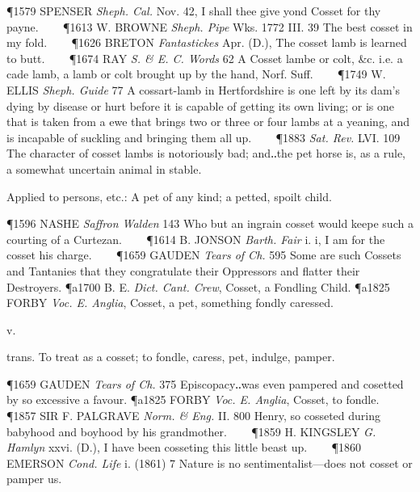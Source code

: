 \begin{description}[wide, labelwidth=!, labelindent=0pt]
\begin{myenumerate}
\P 1579 SPENSER  \textit{Sheph. Cal.} Nov. 42, I shall thee give yond Cosset for thy payne.    
\P 1613 W. BROWNE  \textit{Sheph. Pipe} Wks. 1772 III.  39 The best cosset in my fold.    
\P 1626 BRETON  \textit{Fantastickes} Apr. (D.), The cosset lamb is learned to butt.    
\P 1674 RAY  \textit{S. \& E. C. Words} 62 A Cosset lambe or colt, \&c. i.e. a cade lamb, a lamb or colt brought up by the hand, Norf. Suff.    
\P 1749 W. ELLIS  \textit{Sheph. Guide} 77 A cossart-lamb in Hertfordshire is one left by its dam's dying by disease or hurt before it is capable of getting its own living; or is one that is taken from a ewe that brings two or three or four lambs at a yeaning, and is incapable of suckling and bringing them all up.    
\P 1883  \textit{Sat. Rev.} LVI. 109 The character of cosset lambs is notoriously bad; and‥the pet horse is, as a rule, a somewhat uncertain animal in stable.

 Applied to persons, etc.: A pet of any kind; a petted, spoilt child.

\P 1596 NASHE  \textit{Saffron Walden} 143 Who but an ingrain cosset would keepe such a courting of a Curtezan.    
\P 1614 B. JONSON  \textit{Barth. Fair} i. i, I am for the cosset his charge.    
\P 1659 GAUDEN  \textit{Tears of Ch.} 595 Some are such Cossets and Tantanies that they congratulate their Oppressors and flatter their Destroyers.
\P a1700 B. E. \textit{Dict.  Cant. Crew}, Cosset, a Fondling Child.
\P a1825 FORBY  \textit{Voc. E. Anglia}, Cosset, a pet, something fondly caressed.
\end{myenumerate}



 v.

\noindent {}


\vspace{-0.3cm}

\begin{myenumerate}

 trans. To treat as a cosset; to fondle, caress, pet, indulge, pamper.

\P 1659 GAUDEN  \textit{Tears of Ch.} 375 Episcopacy‥was even pampered and cosetted by so excessive a favour.
\P a1825 FORBY  \textit{Voc. E. Anglia}, Cosset, to fondle.    
\P 1857 SIR F. PALGRAVE  \textit{Norm. \& Eng.} II. 800 Henry, so cosseted during babyhood and boyhood by his grandmother.    
\P 1859 H. KINGSLEY  \textit{G. Hamlyn} xxvi. (D.), I have been cosseting this little beast up.    
\P 1860 EMERSON  \textit{Cond. Life} i. (1861) 7 Nature is no sentimentalist—does not cosset or pamper us.


\end{myenumerate}
\end{description}
